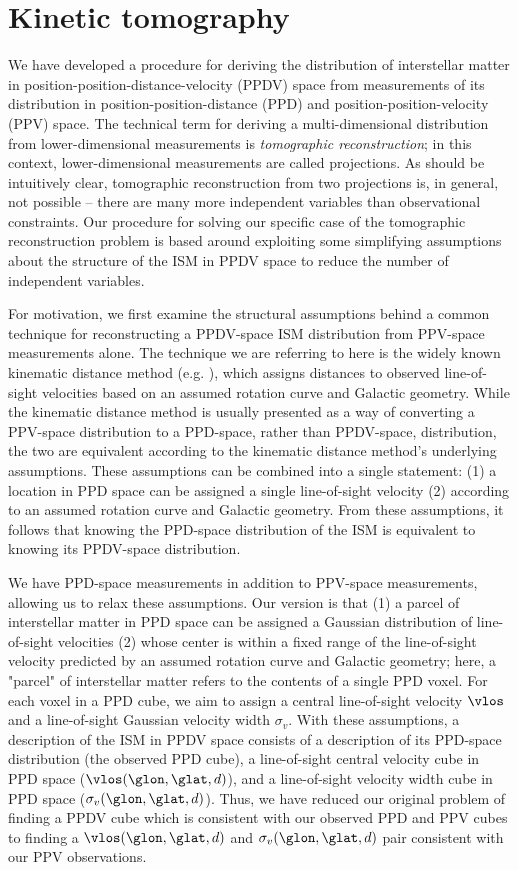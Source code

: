 \section{Kinetic tomography}
\label{sec:KT}
We have developed a procedure for deriving the distribution of interstellar matter in position-position-distance-velocity (PPDV) space from measurements of its distribution in position-position-distance (PPD) and position-position-velocity (PPV) space. 
The technical term for deriving a multi-dimensional distribution from lower-dimensional measurements is \emph{tomographic reconstruction}; in this context, lower-dimensional measurements are called projections. 
As should be intuitively clear, tomographic reconstruction from two projections is, in general, not possible -- there are many more independent variables than observational constraints. 
Our procedure for solving our specific case of the tomographic reconstruction problem is based around exploiting some simplifying assumptions about the structure of the ISM in PPDV space to reduce the number of independent variables.

For motivation, we first examine the structural assumptions behind a common technique for reconstructing a PPDV-space ISM distribution from PPV-space measurements alone. 
The  technique we are referring to here is the widely known kinematic distance method (e.g. \citealt{Levine_2006}), which assigns distances to observed line-of-sight velocities based on an assumed rotation curve and Galactic geometry. 
While the kinematic distance method is usually presented as a way of converting a PPV-space distribution to a PPD-space, rather than PPDV-space, distribution, the two are equivalent according to the kinematic distance method's underlying assumptions.
These assumptions can be combined into a single statement: (1) a location in PPD space can be assigned a single line-of-sight velocity (2) according to an assumed rotation curve and Galactic geometry. 
From these assumptions, it follows that knowing the PPD-space distribution of the ISM is equivalent to knowing its PPDV-space distribution. 

We have PPD-space measurements in addition to PPV-space measurements, allowing us to relax these assumptions. 
Our version is that (1) a parcel of interstellar matter in PPD space can be assigned a Gaussian distribution of line-of-sight velocities (2) whose center is within a fixed range of the line-of-sight velocity predicted by an assumed rotation curve and Galactic geometry; here, a "parcel" of interstellar matter refers to the contents of a single PPD voxel. 
For each voxel in a PPD cube, we aim to assign a central line-of-sight velocity $\vlos$ and a line-of-sight Gaussian velocity width $\sigma_v$. 
With these assumptions, a description of the ISM in PPDV space consists of a description of its PPD-space distribution (the observed PPD cube), a line-of-sight central velocity cube in PPD space ($\vlos(\glon, \glat, d)$), and a line-of-sight velocity width cube in PPD space ($\sigma_v (\glon, \glat, d)$). 
Thus, we have reduced our original problem of finding a PPDV cube which is consistent with our observed PPD and PPV cubes to finding a $\vlos(\glon, \glat, d)$ and $\sigma_v(\glon, \glat, d)$ pair consistent with our PPV observations.


